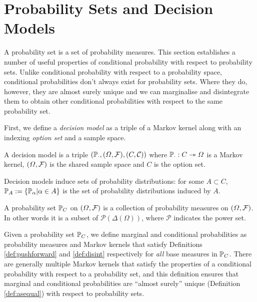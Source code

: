 \section{Probability Sets and Decision Models}\label{sec:probability_sets}

A probability set is a set of probability measures. This section establishes a number of useful properties of conditional probability with respect to probability sets. Unlike conditional probability with respect to a probability space, conditional probabilities don't always exist for probability sets. Where they do, however, they are almost surely unique and we can marginalise and disintegrate them to obtain other conditional probabilities with respect to the same probability set.

First, we define a \emph{decision model} as a triple of a Markov kernel along with an indexing \emph{option set} and a sample space.

\begin{definition}\label{def:dec_model}
A decision model is a triple $(\mathbb{P}_\cdot, (\Omega,\mathcal{F}), (C,\mathcal{C}))$ where $\mathbb{P}_\cdot:C\rightarrowtriangle \Omega$ is a Markov kernel, $(\Omega,\mathcal{F})$ is the shared sample space and $C$ is the option set.
\end{definition}

Decision models induce sets of probability distributions: for some $A\subset C$, $\mathbb{P}_A:=\{\mathbb{P}_\alpha|\alpha\in A\}$ is the set of probability distributions induced by $A$.

\begin{definition}\label{def:prob_set}
A probability set $\mathbb{P}_C$ on $(\Omega,\mathcal{F})$ is a collection of probability measures on $(\Omega,\mathcal{F})$. In other words it is a subset of $\mathscr{P}(\Delta(\Omega))$, where $\mathscr{P}$ indicates the power set.
\end{definition}

Given a probability set $\mathbb{P}_C$, we define marginal and conditional probabilities as probability measures and Markov kernels that satisfy Definitions \ref{def:pushforward} and \ref{def:disint} respectively for \emph{all} base measures in $\mathbb{P}_C$. There are generally multiple Markov kernels that satisfy the properties of a conditional probability with respect to a probability set, and this definition ensures that marginal and conditional probabilities are ``almost surely'' unique (Definition \ref{def:asequal}) with respect to probability sets.


